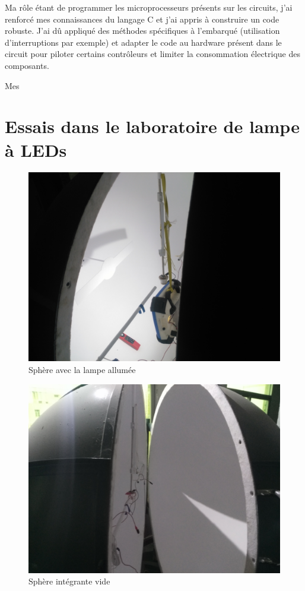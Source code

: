 \documentclass[a4paper, 12pt, sffamily]{report}
\begin{document}
Ma rôle étant de programmer les microprocesseurs présents sur les circuits, j'ai renforcé mes connaissances du langage C et j'ai appris à construire un code robuste. J'ai dû appliqué des méthodes spécifiques à l'embarqué (utilisation d'interruptions par exemple) et adapter le code au hardware présent dans le circuit pour piloter certains contrôleurs et limiter la consommation électrique des composants.

Mes

\appendix

\chapter{Essais dans le laboratoire de lampe à LEDs}
\label{cha:labo_pictures}

\begin{figure}[H]
\centering
\includegraphics[scale=0.08]{figures/photos/tests_worklamp/sphere/sphere_allumee.jpg}
\caption{Sphère avec la lampe allumée} 
\label{fig:lamp_on}
\end{figure}

\begin{figure}[H]
\centering
\includegraphics[scale=0.08]{figures/photos/tests_worklamp/sphere/spehre_vide.jpg}
\caption{Sphère intégrante vide}
\label{fig:empty_sphere}
\end{figure}
\end{document}
